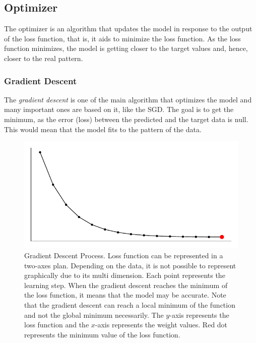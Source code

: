 \subsection{Optimizer}\label{sec:optimizer}

The optimizer is an algorithm that updates the model in response to the output of the loss function, that is, it aids to minimize the loss function. 
As the loss function minimizes, the model is getting closer to the target values and, hence, closer to the real pattern.

\subsubsection*{Gradient Descent} 

The \emph{gradient descent} is one of the main algorithm \cite{nesterov2004} that optimizes the model and many important ones are based on it, like the SGD. 
The goal is to get the minimum, as the error (loss) between the predicted and the target data is null. 
This would mean that the model fits to the pattern of the data.
%
\begin{figure}[!htb]
    \centering
    \caption[Gradient Descent Process]{Gradient Descent Process. Loss function can be represented in a two-axes plan. Depending on the data, it is not possible to represent graphically due to its multi dimension. Each point represents the learning step. When the gradient descent reaches the minimum of the loss function, it means that the model may be accurate. Note that the gradient descent can reach a local minimum of the function and not the global minimum necessarily. The \(y\)-axis represents the loss function and the \(x\)-axis represents the weight values. Red dot represents the minimum value of the loss function.}
    \includegraphics{figures/3review/nn/gradient_descent.pdf}
    
    
\end{figure}

